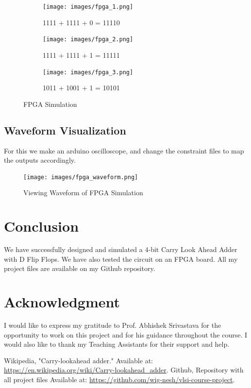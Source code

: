 \documentclass[conference]{IEEEtran}
\begin{document}
\begin{figure}[H]
    \centering
    \begin{subfigure}{0.43\textwidth}
        \texttt{[image: images/fpga\_1.png]}
        \caption{1111 + 1111 + 0 = 11110}
    \end{subfigure}
    \hfill
    \begin{subfigure}{0.43\textwidth}
        \texttt{[image: images/fpga\_2.png]}
        \caption{1111 + 1111 + 1 = 11111}
    \end{subfigure}
    \hfill
    \begin{subfigure}{0.43\textwidth}
        \texttt{[image: images/fpga\_3.png]}
        \caption{1011 + 1001 + 1 = 10101}
    \end{subfigure}
    
    \caption{FPGA Simulation}
\end{figure}

\subsection{Waveform Visualization}

For this we make an arduino oscilloscope, and change the constraint files to map the outputs accordingly.

\begin{figure}[H]
    \centering
    \texttt{[image: images/fpga\_waveform.png]}
    \caption{Viewing Waveform of FPGA Simulation}
\end{figure}

\section{Conclusion}

We have successfully designed and simulated a 4-bit Carry Look Ahead Adder with D Flip Flops. We have also tested the circuit on an FPGA board. All my project files are available on my Github repository. \cite{b2}

\section*{Acknowledgment}
I would like to express my gratitude to Prof. Abhishek Srivastava for the opportunity to work on this project and for his guidance throughout the course. I would also like to thank my Teaching Assistants for their support and help.

\begin{thebibliography}{00}
     Wikipedia, "Carry-lookahead adder." Available at: \url{https://en.wikipedia.org/wiki/Carry-lookahead_adder}.
     Github, Repository with all project files Available at: \url{https://github.com/wig-nesh/vlsi-course-project}.
\end{thebibliography}
    
\end{document}
